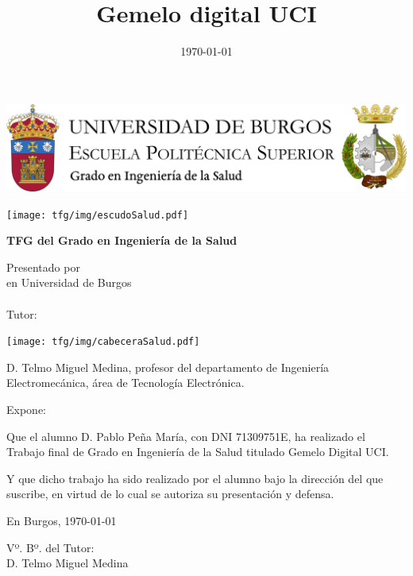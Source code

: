 \documentclass[a4paper,12pt,twoside]{memoir}
\title{Gemelo digital UCI}
\author{\nombre}
\date{\today}
\makeatletter
\def\maketitle{
  \null
  \thispagestyle{empty}
\begin{center}
  \noindent\includegraphics[width=\textwidth]{cabeceraSalud}\vspace{1.5cm}%
\end{center}
  
  \begin{center}
    \begin{minipage}[c][1.5cm][c]{.20\textwidth}
        \texttt{[image: tfg/img/escudoSalud.pdf]}
    \end{minipage}
  \end{center}
  
  \begin{center}
    \colorbox{cpardoBox}{%
        \begin{minipage}{.8\textwidth}
          \vspace{.5cm}\Large
          \begin{center}
          \textbf{TFG del Grado en Ingeniería de la Salud}\vspace{.6cm}\\
          \textbf{\LARGE\@title{}}
          \end{center}
          \vspace{.2cm}
        \end{minipage}
    }%
  \end{center}
  
  \begin{center}%
  {%
    \noindent\LARGE
    Presentado por \@author{}\\ 
    en Universidad de Burgos\\
    \vspace{0.5cm}
    \noindent\Large
    \@date{}\\
    \vspace{0.5cm}
    Tutor: \@tutor{}\\ %
  }%
  \end{center}%
  \null
  \cleardoublepage
  }
\newcommand{\nombre}{Pablo Peña María}
\newcommand{\nombreTutor}{Telmo Miguel Medina}
\newcommand{\nombreTutorb}{Tutor 2}
\newcommand{\dni}{71309751E}
\makeatother
\begin{document}
\maketitle


\newpage\null\thispagestyle{empty}\newpage

\thispagestyle{empty}


\noindent\texttt{[image: tfg/img/cabeceraSalud.pdf]}\vspace{1cm}

\noindent D. \nombreTutor, profesor del departamento de Ingeniería Electromecánica, área de Tecnología Electrónica.

\noindent Expone:

\noindent Que el alumno D. \nombre, con DNI \dni, ha realizado el Trabajo final de Grado en Ingeniería de la Salud titulado Gemelo Digital UCI. 

\noindent Y que dicho trabajo ha sido realizado por el alumno bajo la dirección del que suscribe, en virtud de lo cual se autoriza su presentación y defensa.

\begin{center} %
En Burgos, {\large \today}
\end{center}

\vfill\vfill\vfill

\begin{minipage}{0.45\textwidth}
\begin{flushleft} %
Vº. Bº. del Tutor:\\[2cm]
D. \nombreTutor
\end{flushleft}
\end{minipage}
\hfill
\begin{minipage}{0.45\textwidth}
\begin{flushleft} %
\end{flushleft}
\end{minipage}
\hfill

\vfill



\newpage\null\thispagestyle{empty}\newpage




\frontmatter
\end{document}
